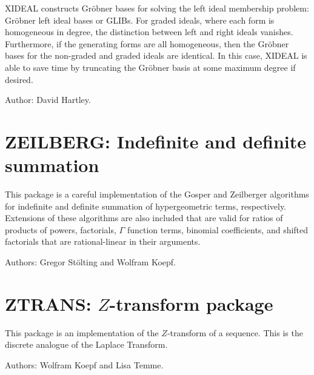 XIDEAL constructs Gr\"obner bases for solving the left ideal membership
problem: Gr\"obner left ideal bases or GLIBs. For graded ideals, where each
form is homogeneous in degree, the distinction between left and right
ideals vanishes. Furthermore, if the generating forms are all homogeneous,
then the Gr\"obner bases for the non-graded and graded ideals are
identical. In this case, XIDEAL is able to save time by truncating the
Gr\"obner basis at some maximum degree if desired.

Author: David Hartley.


\newpage

\section{ZEILBERG: Indefinite and definite summation}

This package is a careful implementation of the Gosper and Zeilberger
algorithms for indefinite and definite summation of hypergeometric terms,
respectively.  Extensions of these algorithms are also included that are
valid for ratios of products of powers, factorials, $\Gamma$ function
terms, binomial coefficients, and shifted factorials that are
rational-linear in their arguments.

Authors: Gregor St\"olting and Wolfram Koepf.


\newpage

\section{ZTRANS: \texorpdfstring{$Z$}{\textit{Z}}-transform package}

This package is an implementation of the $Z$-transform of a sequence.
This is the discrete analogue of the Laplace Transform.

Authors: Wolfram Koepf and Lisa Temme.


\let\sectionmark=\origsectionmark
